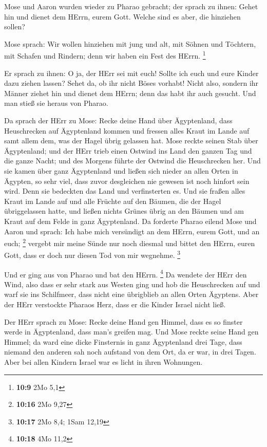  Mose und Aaron wurden wieder zu Pharao gebracht; der sprach
zu ihnen: Gehet hin und dienet dem HErrn, eurem Gott. Welche sind es
aber, die hinziehen sollen?

 Mose sprach: Wir wollen hinziehen mit jung und alt, mit
Söhnen und Töchtern, mit Schafen und Rindern; denn wir haben ein Fest
des HErrn. \footnote{\textbf{10:9} 2Mo 5,1}

 Er sprach zu ihnen: O ja, der HErr sei mit euch! Sollte
ich euch und eure Kinder dazu ziehen lassen? Sehet da, ob ihr nicht
Böses vorhabt!  Nicht also, sondern ihr Männer ziehet hin
und dienet dem HErrn; denn das habt ihr auch gesucht. Und man stieß sie
heraus von Pharao.

 Da sprach der HErr zu Mose: Recke deine Hand über
Ägyptenland, dass Heuschrecken auf Ägyptenland kommen und fressen alles
Kraut im Lande auf samt allem dem, was der Hagel übrig gelassen hat.
 Mose reckte seinen Stab über Ägyptenland; und der HErr
trieb einen Ostwind ins Land den ganzen Tag und die ganze Nacht; und des
Morgens führte der Ostwind die Heuschrecken her.  Und sie
kamen über ganz Ägyptenland und ließen sich nieder an allen Orten in
Ägypten, so sehr viel, dass zuvor desgleichen nie gewesen ist noch
hinfort sein wird.  Denn sie bedeckten das Land und
verfinsterten es. Und sie fraßen alles Kraut im Lande auf und alle
Früchte auf den Bäumen, die der Hagel übriggelassen hatte, und ließen
nichts Grünes übrig an den Bäumen und am Kraut auf dem Felde in ganz
Ägyptenland.  Da forderte Pharao eilend Mose und Aaron und
sprach: Ich habe mich versündigt an dem HErrn, eurem Gott, und an euch;
\footnote{\textbf{10:16} 2Mo 9,27}  vergebt mir meine Sünde
nur noch diesmal und bittet den HErrn, euren Gott, dass er doch nur
diesen Tod von mir wegnehme. \footnote{\textbf{10:17} 2Mo 8,4; 1Sam
  12,19}

 Und er ging aus von Pharao und bat den HErrn. \footnote{\textbf{10:18}
  4Mo 11,2}  Da wendete der HErr den Wind, also dass er
sehr stark aus Westen ging und hob die Heuschrecken auf und warf sie ins
Schilfmeer, dass nicht eine übrigblieb an allen Orten Ägyptens.
 Aber der HErr verstockte Pharaos Herz, dass er die Kinder
Israel nicht ließ.

 Der HErr sprach zu Mose: Recke deine Hand gen Himmel, dass
es so finster werde in Ägyptenland, dass man's greifen mag.
 Und Mose reckte seine Hand gen Himmel; da ward eine dicke
Finsternis in ganz Ägyptenland drei Tage,  dass niemand den
anderen sah noch aufstand von dem Ort, da er war, in drei Tagen. Aber
bei allen Kindern Israel war es licht in ihren Wohnungen.

